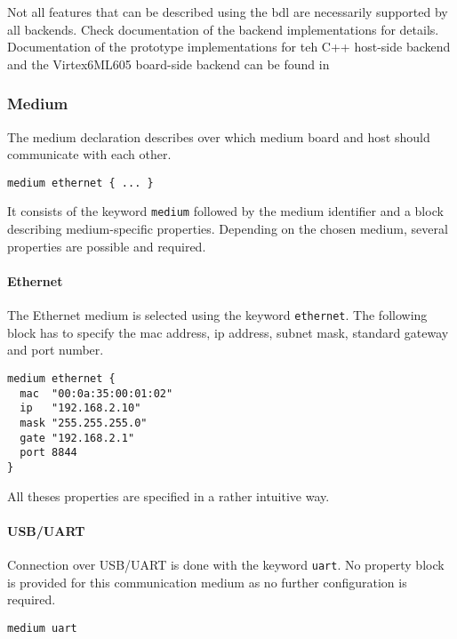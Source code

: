 \documentclass{report}
\begin{document}

Not all features that can be described using the bdl are necessarily supported by all backends. Check documentation of the backend implementations for details. Documentation of the prototype implementations for teh C++ host-side backend and the Virtex6ML605 board-side backend can be found in 

\subsubsection{Medium}
The medium declaration describes over which medium board and host should communicate with each other.

\begin{lstlisting}[language=bdl]
medium ethernet { ... }
\end{lstlisting}

It consists of the keyword \texttt{medium} followed by the medium identifier and a block describing medium-specific properties. Depending on the chosen medium, several properties are possible and required.

\paragraph{Ethernet}
The Ethernet medium is selected using the keyword \texttt{ethernet}. The following block has to specify the mac address, ip address, subnet mask, standard gateway and port number.

\begin{lstlisting}[language=bdl]
medium ethernet {
  mac  "00:0a:35:00:01:02"
  ip   "192.168.2.10"
  mask "255.255.255.0"
  gate "192.168.2.1"
  port 8844
}
\end{lstlisting}

All theses properties are specified in a rather intuitive way.

\paragraph{USB/UART}
Connection over USB/UART is done with the keyword \texttt{uart}. No property block is provided for this communication medium as no further configuration is required.

\begin{lstlisting}[language=bdl]
medium uart
\end{lstlisting}
\end{document}
